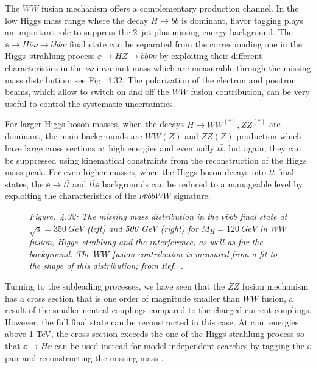 {The $WW$ fusion mechanism offers a complementary production channel.  In the
low Higgs mass range where the decay $H\to b\bar{b}$ is dominant, flavor tagging
plays an important role to suppress the 2--jet plus missing energy background. 
The $\ee \to H\bar{\nu}\nu \to b\bar{b}\bar{\nu}\nu$ final state can be
separated from the corresponding one in the Higgs--strahlung process $\ee \to
HZ \to b\bar{b}\bar{\nu}\nu$ \cite{WWH-sep} by exploiting their different
characteristics in the $\nu \bar{\nu}$ invariant mass which are measurable
through the missing mass distribution; see Fig.~4.32. The polarization of the
electron and positron beams, which allow to switch on and off the $WW$ fusion
contribution, can be very useful to control the systematic uncertainties. \s
 
For larger Higgs boson masses, when the decays $H \to WW^{(*)},ZZ^{(*)}$ are
dominant, the main backgrounds are $WW(Z)$ and $ZZ(Z)$ production which have
large cross sections at high energies and eventually $t\bar t$, but again, they
can be suppressed using kinematical constraints from the reconstruction of the
Higgs mass peak. \s For even higher masses, when the Higgs boson decays into
$t\bar{t}$ final states, the $\ee \to t\bar{t}$ and $ t\bar{t} \ee$ backgrounds
can be reduced to a manageable level by exploiting the characteristics of the
$\nu \bar \nu b\bar b  WW$ signature.

\begin{figure}[ht!]
\begin{center}
{{}} 
{{}} %
\end{center}
\vspace*{-2mm}
{\it Figure.~4.32: 
The missing mass distribution in the $\nu \bar{\nu} b \bar b$ final state at 
$\sqrt{s} =350~{GeV}$ (left) and 500 GeV (right) for $M_H = 120~{GeV}$ 
in $WW$ fusion, Higgs--strahlung and the interference, as well as for the 
background. The $WW$ fusion contribution is measured from a fit to the shape 
of this distribution; from Ref.~\cite{TESLA}.  }
\vspace*{-5mm}
\end{figure}

Turning to the subleading processes,  we have seen that the $ZZ$ fusion
mechanism has a cross section that is one order of magnitude smaller than $WW$
fusion, a result of the smaller neutral couplings compared to the charged
current couplings. However, the full final state can be reconstructed in this
case.  At c.m. energies above 1 TeV, the cross section exceeds the one of the
Higgs strahlung process so that $\ee \to H \ee$ can be used instead for model
independent searches by tagging the $\ee$ pair and reconstructing the missing
mass \cite{LCWS}. \s

}

